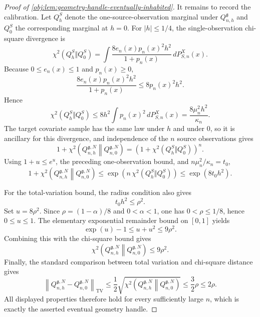 \begin{proof}[Proof of \cref{obj:lem:geometry-handle-eventually-inhabited}]
It remains to record the calibration. Let \(Q_h^S\) denote the one-source-observation marginal under \(Q_{n,h}^{\mathfrak g}\) and \(Q_0^S\) the corresponding marginal at \(h=0\). For \(|h|\le1/4\), the single-observation chi-square divergence is
\[
\chi^2(Q_h^S\Vert Q_0^S)
=
\int
\frac{8e_n(x)p_n(x)^2h^2}{1+p_n(x)}
\,dP_{S,n}^X(x).
\] %
Because \(0\le e_n(x)\le1\) and \(p_n(x)\ge0\),
\[
\frac{8e_n(x)p_n(x)^2h^2}{1+p_n(x)}
\le
8p_n(x)^2h^2 .
\]
Hence
\[
\chi^2(Q_h^S\Vert Q_0^S)
\le
8h^2\int p_n(x)^2\,dP_{S,n}^X(x)
=
\frac{8\mu_n^2h^2}{\kappa_n}.
\] %
The target covariate sample has the same law under \(h\) and under \(0\), so it is ancillary for this divergence, and independence of the \(n\) source observations gives
\[
1+\chi^2\!\left(Q_{n,h}^{\mathfrak g,N}\middle\|Q_{n,0}^{\mathfrak g,N}\right)
=
\left(1+\chi^2(Q_h^S\Vert Q_0^S)\right)^n .
\] %
Using \(1+u\le e^u\), the preceding one-observation bound, and \(n\mu_n^2/\kappa_n=t_0\),
\[
1+\chi^2\!\left(Q_{n,h}^{\mathfrak g,N}\middle\|Q_{n,0}^{\mathfrak g,N}\right)
\le
\exp\!\left(n\,\chi^2(Q_h^S\Vert Q_0^S)\right)
\le
\exp(8t_0h^2).
\] %

For the total-variation bound, the radius condition also gives
\[
t_0h^2\le \rho^2 .
\] %
Set \(u=8\rho^2\). Since \(\rho=(1-\alpha)/8\) and \(0<\alpha<1\), one has \(0<\rho\le1/8\), hence \(0\le u\le1\). The elementary exponential remainder bound on \([0,1]\) yields
\[
\exp(u)-1\le u+u^2\le 9\rho^2 .
\] %
Combining this with the chi-square bound gives
\[
\chi^2\!\left(Q_{n,h}^{\mathfrak g,N}\middle\|Q_{n,0}^{\mathfrak g,N}\right)
\le 9\rho^2 .
\] %
Finally, the standard comparison between total variation and chi-square distance gives
\[
\left\|Q_{n,h}^{\mathfrak g,N}-Q_{n,0}^{\mathfrak g,N}\right\|_{\mathrm{TV}}
\le
\frac12
\sqrt{
\chi^2\!\left(Q_{n,h}^{\mathfrak g,N}\middle\|Q_{n,0}^{\mathfrak g,N}\right)}
\le
\frac32\rho
\le
2\rho .
\] %
All displayed properties therefore hold for every sufficiently large \(n\), which is exactly the asserted eventual geometry handle. %
\end{proof}
